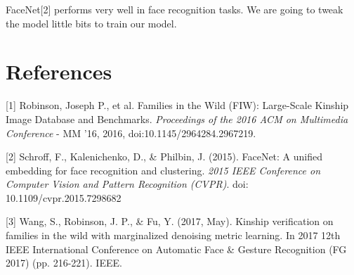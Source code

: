 \documentclass{article}
\begin{document}
FaceNet[2] performs very well in face recognition tasks. We are going to tweak the
model little bits to train our model.

\section*{References}
\medskip
\small
[1] Robinson, Joseph P., et al. Families in the Wild (FIW): Large-Scale Kinship
Image Database and Benchmarks. {\it Proceedings of the 2016 ACM on Multimedia
Conference} - MM '16, 2016, doi:10.1145/2964284.2967219.

[2] Schroff, F., Kalenichenko, D., \& Philbin, J. (2015). FaceNet: A unified
embedding for face recognition and clustering. {\it 2015 IEEE Conference on
Computer Vision and Pattern Recognition (CVPR)}. doi: 10.1109/cvpr.2015.7298682

[3] Wang, S., Robinson, J. P., & Fu, Y. (2017, May). Kinship verification on
families in the wild with marginalized denoising metric learning. In 2017 12th
IEEE International Conference on Automatic Face & Gesture Recognition (FG 2017)
(pp. 216-221). IEEE.
\end{document}
